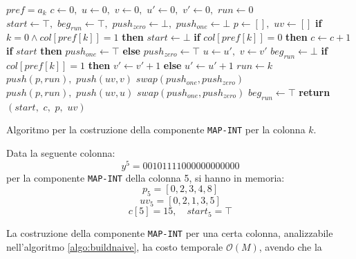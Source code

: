 \begin{algorithm}
  \small
  \begin{algorithmic}[1]
    \Comment $pref=a_k$
    \State $c\gets 0,\,\,u\gets 0,\,\,v\gets 0,\,\,u'\gets 0,\,\, v'\gets
    0,\,\,run\gets 0$
    \State $start \gets \top,\,\,beg_{run}\gets \top,\,\,push_{zero}\gets
    \bot,\,\,push_{one}\gets \bot$
    \State $p\gets [],\,\,uv\gets []$
    \For {\textit{every} $k\in\left[0,\,\, M\right)$}
    \State \textbf{if} $k=0\land col[pref[k]]=1$ \textbf{then} $start \gets \bot$ 
    \State \textbf{if} $col[pref[k]]=0$ \textbf{then} $c\gets c+1$
    \EndFor
    \State \textbf{if} $start$ \textbf{then} $push_{one}\gets \top$
    \textbf{else} $push_{zero}\gets \top$
    \For{\textit{every} $k\in[0,M)$}
    \State $u\gets u',\,\,v\gets v'$
    \State $beg_{run}\gets \bot$
    \EndIf
    \State \textbf{if} $col[pref[k]]=1$ \textbf{then}  $v'\gets v'+1$
    \textbf{else} $u'\gets u'+1$
    \State $run\gets k$
    \EndIf
    \State $push(p, run),\,\,push(uv, v)$
    \State $swap(push_{one}, push_{zero})$
    \Else
    \State $push(p, run),\,\,push(uv, u)$
    \State $swap(push_{one}, push_{zero})$
    \EndIf
    \State $beg_{run}\gets \top$
    \EndIf
    \EndFor
    \State \textbf{return} $(start,\,\, c,\,\, p,\,\, uv)$
    \EndFunction
  \end{algorithmic}
  \caption{\footnotesize{Algoritmo per la costruzione della componente
  \texttt{MAP-INT} per la colonna $k$.}}
  \label{algo:buildnaive}
\end{algorithm}
\begin{esempio}
  Data la seguente colonna:
  \[y^5=00101111000000000000\]
  per la componente \texttt{MAP-INT} della colonna 5, si hanno in memoria:
  \[p_5=[0,2,3,4,8]\]
  \[uv_5=[0,2,1,3,5]\]
  \[c[5]=15,\quad start_5=\top\]
\end{esempio}
La costruzione della componente \texttt{MAP-INT} per una certa colonna,
analizzabile nell'algoritmo 
\ref{algo:buildnaive}, ha costo temporale $\mathcal{O}(M)$, avendo che la

